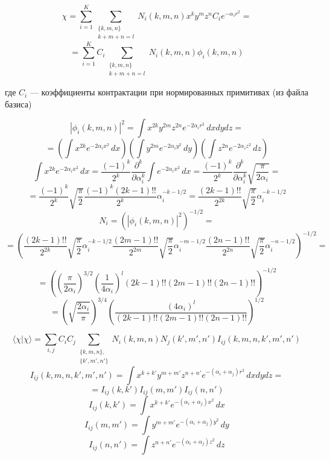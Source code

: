 \documentclass[a4paper,14pt]{extarticle}
\begin{document}
\begin{enumerate}
$$ \chi = \sum_{i = 1} ^ K\sum_{\substack { \{k,m,n\} \\ k+m+n = l} } N_i(k,m,n) x^ky^mz^n C_ie^{-\alpha_ir^2} = $$
$$ =\sum_{i=1}^K C_i\sum_{\substack { \{k,m,n\} \\ k+m+n = l} } N_i(k,m,n)\phi_i(k,m,n) $$

где $C_i$ --- коэффициенты контрактации при нормированных примитивах (из файла базиса)

$$|\phi_i(k,m,n)|^2 = \int x^{2k}y^{2m}z^{2n} e^{-2\alpha_ir^2}\,dxdydz = $$
$$ = \left( \int x^{2k} e^{-2\alpha_i x^2}\,dx \right)\left( \int y^{2m} e^{-2\alpha_i y^2}\,dy \right)\left( \int z^{2n} e^{-2\alpha_i z^2}\,dz \right)$$
$$ \int x^{2k} e^{-2\alpha_i x^2}\,dx = \frac{(-1)^k}{2^k}\frac{\partial^k}{\partial\alpha_i^k}\int e^{-2\alpha_i x^2}\, dx = \frac{(-1)^k}{2^k}\frac{\partial^k}{\partial\alpha_i^k}%
																	 \sqrt{\frac{\pi}{2\alpha_i}} =$$
$$ = \frac{(-1)^k}{2^k}\sqrt{\frac{\pi}{2}}\frac{(-1)^k(2k-1)!!}{2^k}\alpha_i^{-k-1/2} = \frac{(2k-1)!!}{2^{2k}}\sqrt{\frac{\pi}{2}}\alpha_i^{-k-1/2}$$
$$N_i = \left( |\phi_i(k,m,n)|^2 \right)^{-1/2} = $$ 
$$ = \left(%
	    \frac{(2k-1)!!}{2^{2k}}\sqrt{\frac{\pi}{2}}\alpha_i^{-k-1/2} %
	    \frac{(2m-1)!!}{2^{2m}}\sqrt{\frac{\pi}{2}}\alpha_i^{-m-1/2} %
	    \frac{(2n-1)!!}{2^{2n}}\sqrt{\frac{\pi}{2}}\alpha_i^{-n-1/2} %
	    \right)^{-1/2} = $$

$$ = \left( \left( \frac{\pi}{2\alpha_i}\right)^{3/2} \left(\frac{1}{4\alpha_i}\right)^{l}(2k-1)!!(2m-1)!!(2n-1)!! \right)^{-1/2} $$
$$ = \left(\sqrt{ \frac{2\alpha_i}{\pi} } \right)^{3/4}\left(\frac{(4\alpha_i)^l}{(2k-1)!!(2m-1)!!(2n-1)!!}\right)^{1/2}$$


$$\langle\chi|\chi\rangle = %
	 \sum_{i,j}C_iC_j\sum_{\substack { \{k,m,n\},\\ \{k',m',n'\} }} N_i(k,m,n)N_j(k',m',n') I_{ij}(k,m,n,k',m',n')$$
$$I_{ij}(k,m,n,k',m',n') = \int x^{k+k'}y^{m+m'}z^{n+n'}e^{-(\alpha_i+\alpha_j)r^2}\,dxdydz = $$
$$ = I_{ij}(k,k')I_{ij}(m,m')I_{ij}(n,n')$$
$$ I_{ij}(k,k') = \int x^{k+k'}e^{-(\alpha_i+\alpha_j)x^2}\,dx$$
$$ I_{ij}(m,m') = \int y^{m+m'}e^{-(\alpha_i+\alpha_j)y^2}\,dy$$
$$ I_{ij}(n,n') = \int z^{n+n'}e^{-(\alpha_i+\alpha_j)z^2}\,dz$$


\end{enumerate}
\end{document}
